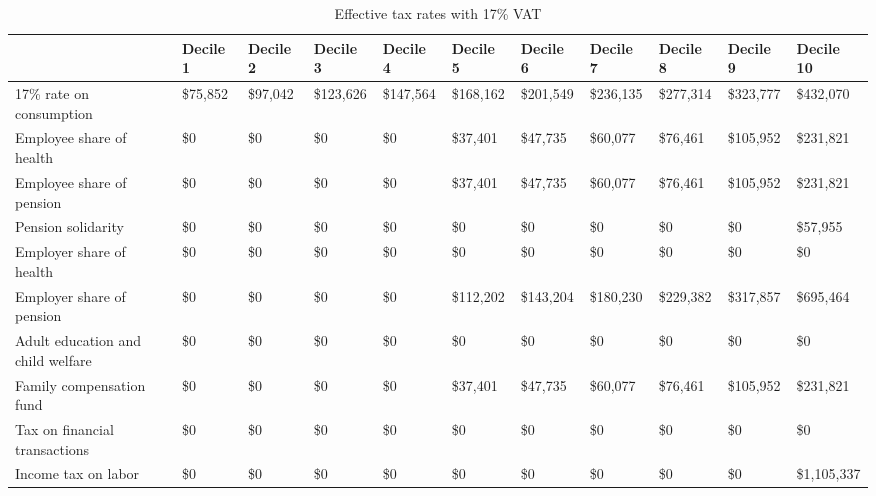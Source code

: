 \documentclass[12pt]{article}
\begin{document}
\begin{landscape}
\begin{table}[]
\caption{Effective tax rates with 17\% VAT}
\label{tab:t17}
\footnotesize
\begin{tabular}{lllllllllll} \hline
\label{tab:t17}

& Decile 1                          & Decile 2  & Decile 3  & Decile 4  & Decile 5    & Decile 6    & Decile 7    & Decile 8    & Decile 9    & Decile 10                 \\ \hline
17\% rate on consumption          & \$75,852  & \$97,042  & \$123,626 & \$147,564   & \$168,162   & \$201,549   & \$236,135   & \$277,314   & \$323,777   & \$432,070    \\
Employee share of health          & \$0       & \$0       & \$0       & \$0         & \$37,401    & \$47,735    & \$60,077    & \$76,461    & \$105,952   & \$231,821    \\
Employee share of pension         & \$0       & \$0       & \$0       & \$0         & \$37,401    & \$47,735    & \$60,077    & \$76,461    & \$105,952   & \$231,821    \\
Pension solidarity                & \$0       & \$0       & \$0       & \$0         & \$0         & \$0         & \$0         & \$0         & \$0         & \$57,955     \\
Employer share of health          & \$0       & \$0       & \$0       & \$0         & \$0         & \$0         & \$0         & \$0         & \$0         & \$0          \\
Employer share of pension         & \$0       & \$0       & \$0       & \$0         & \$112,202   & \$143,204   & \$180,230   & \$229,382   & \$317,857   & \$695,464    \\
Adult education and child welfare & \$0       & \$0       & \$0       & \$0         & \$0         & \$0         & \$0         & \$0         & \$0         & \$0          \\
Family compensation fund          & \$0       & \$0       & \$0       & \$0         & \$37,401    & \$47,735    & \$60,077    & \$76,461    & \$105,952   & \$231,821    \\
Tax on financial transactions     & \$0       & \$0       & \$0       & \$0         & \$0         & \$0         & \$0         & \$0         & \$0         & \$0          \\
Income tax on labor               & \$0       & \$0       & \$0       & \$0         & \$0         & \$0         & \$0         & \$0         & \$0         & \$1,105,337  \\

\end{tabular}
\end{table}
\end{landscape}
\end{document}
